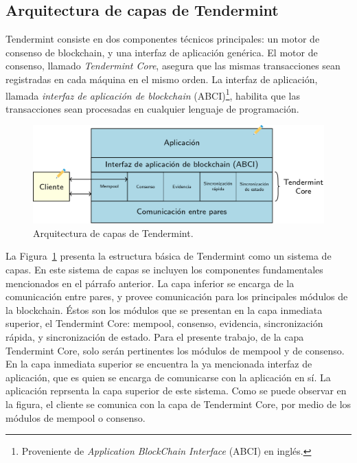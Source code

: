 \subsection{Arquitectura de capas de Tendermint}\label{subsec:layers}
Tendermint consiste en dos componentes técnicos principales: un motor de consenso de blockchain, y una interfaz
de aplicación genérica.
%
El motor de consenso, llamado \textit{Tendermint Core}, asegura que las mismas transacciones sean registradas en cada
máquina en el mismo orden.
%
La interfaz de aplicación, llamada \textit{interfaz de aplicación de blockchain} (ABCI)\footnote{Proveniente de \textit{Application
BlockChain Interface} (ABCI) en inglés.}, habilita que las transacciones
sean procesadas en cualquier lenguaje de programación.

\begin{figure}
  \centering
  \includegraphics[scale=0.3]{figures/tendermint-layers.png}
  \caption{Arquitectura de capas de Tendermint.}
  \label{fig:tendermint-architecture}
\end{figure}

La Figura~\ref{fig:tendermint-architecture} presenta la estructura básica de Tendermint como un sistema de capas.
%
En este sistema de capas se incluyen los componentes fundamentales mencionados en el párrafo anterior.
%
La capa inferior se encarga de la comunicación entre pares, y provee comunicación para los principales
módulos de la blockchain.
%
Éstos son los módulos que se presentan en la capa inmediata superior, el
Tendermint Core: mempool, consenso, evidencia, sincronización rápida, y sincronización de estado.
%
Para el presente trabajo, de la capa Tendermint Core, solo serán pertinentes los módulos de mempool y de consenso.
%
En la capa inmediata superior se encuentra la ya mencionada interfaz de aplicación, que es quien se encarga de comunicarse
con la aplicación en sí.
%
La aplicación reprsenta la capa superior de este sistema.
%
Como se puede observar en la figura, el cliente se comunica con la capa de Tendermint Core, por medio de los
módulos de mempool o consenso. 

